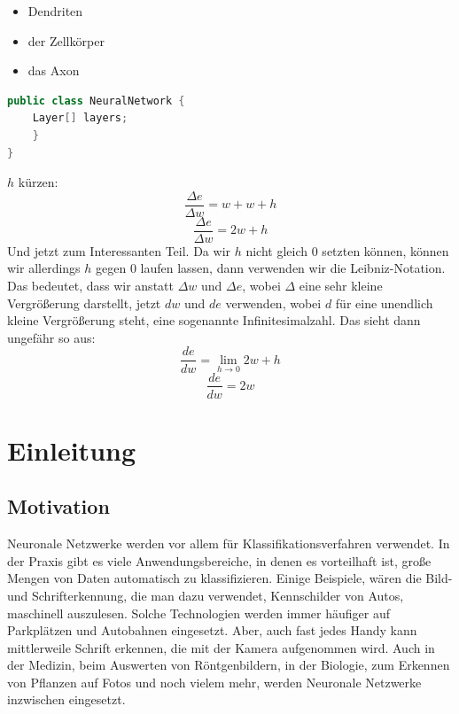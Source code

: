 \documentclass[12pt]{article}
\begin{document}
\begin{itemize}
  \item Dendriten
  \item der Zellkörper
  \item das Axon
\end{itemize}

\begin{lstlisting}[language=Java]
public class NeuralNetwork {
    Layer[] layers;
    }
}
\end{lstlisting}

$h$ kürzen:
$$\frac{\Delta e}{\Delta w}=w+w+h$$
$$\frac{\Delta e}{\Delta w}=2w+h$$Und jetzt zum Interessanten Teil. Da wir $h$ nicht gleich 0 setzten können, können wir allerdings $h$ gegen 0 laufen lassen, dann verwenden wir die Leibniz-Notation. Das bedeutet, dass wir anstatt  $\Delta w$ und  $\Delta e$, wobei $\Delta$ eine sehr kleine Vergrößerung darstellt, jetzt $dw$ und $de$ verwenden, wobei $d$ für eine unendlich kleine Vergrößerung steht, eine sogenannte Infinitesimalzahl.
Das sieht dann ungefähr so aus:
$$\frac{de}{dw}=\lim_{h\to 0} 2w +h$$
$$\frac{de}{dw}=2w$$


\section{Einleitung}
\subsection{Motivation}
Neuronale Netzwerke werden vor allem für Klassifikationsverfahren verwendet. In der Praxis gibt es viele Anwendungsbereiche, in denen es vorteilhaft ist, große Mengen von Daten automatisch zu klassifizieren. Einige Beispiele, wären die Bild- und Schrifterkennung, die man dazu verwendet, Kennschilder von Autos, maschinell auszulesen. Solche Technologien werden immer häufiger auf Parkplätzen und Autobahnen eingesetzt. Aber, auch fast jedes Handy kann mittlerweile Schrift erkennen, die mit der Kamera aufgenommen wird. Auch in der Medizin, beim Auswerten von Röntgenbildern, in der Biologie, zum Erkennen von Pflanzen auf Fotos und noch vielem mehr, werden Neuronale Netzwerke inzwischen eingesetzt.\\

\cleardoublepage
\sloppy
\end{document}
